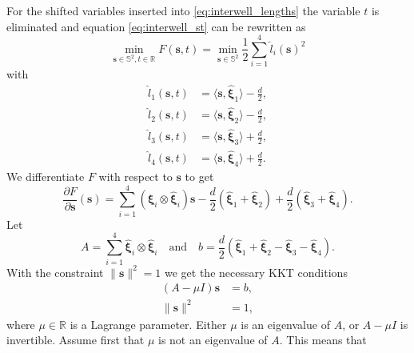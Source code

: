 %
For the shifted variables inserted into \eqref{eq:interwell_lengths} 
the variable $t$ is eliminated and equation \eqref{eq:interwell_st} 
can be rewritten as
%
\begin{equation}
\min_{ \textbf{s} \in \mathbb{S}^2, t \in \mathbb{R}} F(\textbf{s},t)=\min_{ \textbf{s} \in \mathbb{S}^2} \frac{1}{2}  \sum_{i=1}^4 \hat{l}_i(\textbf{s})^2
\end{equation}
%
with
%
\begin{equation}
\begin{aligned}
\hat{l}_1(\textbf{s},t) &=  \langle \textbf{s},\hat{\boldsymbol{\xi}}_1 \rangle - \frac{d}{2}, \\
\hat{l}_2(\textbf{s},t) &=  \langle \textbf{s},\hat{\boldsymbol{\xi}}_2 \rangle - \frac{d}{2}, \\
\hat{l}_3(\textbf{s},t) &=  \langle \textbf{s},\hat{\boldsymbol{\xi}}_3 \rangle + \frac{d}{2}, \\
\hat{l}_4(\textbf{s},t) &=  \langle \textbf{s},\hat{\boldsymbol{\xi}}_4 \rangle + \frac{d}{2}.
\label{eq:interwell_lengths_trans} 
\end{aligned}
\end{equation}
%
We differentiate $F$ with respect to $\textbf{s}$ to get
%
\begin{equation}
\frac{\partial F}{\partial \textbf{s}} (\textbf{s}) =  \sum_{i=1}^4 (\hat{\boldsymbol{\xi}}_i \otimes \hat{\boldsymbol{\xi}}_i)\textbf{s}
- \frac{d}{2}(\hat{\boldsymbol{\xi}}_1 + \hat{\boldsymbol{\xi}}_2) + \frac{d}{2}(\hat{\boldsymbol{\xi}}_3 + \hat{\boldsymbol{\xi}}_4).
\end{equation}
%
Let
%
\begin{equation}
A = \sum_{i=1}^4 \hat{\boldsymbol{\xi}}_i \otimes \hat{\boldsymbol{\xi}}_i \quad \text{and} \quad 
b = \frac{d}{2}(\hat{\boldsymbol{\xi}}_1 + \hat{\boldsymbol{\xi}}_2 - \hat{\boldsymbol{\xi}}_3 - \hat{\boldsymbol{\xi}}_4).
\label{eq:A_b_four_points}
\end{equation}
%
With the constraint $\| \textbf{s}\|^2 = 1$
we get the necessary KKT conditions
%
\begin{equation}
\begin{aligned}
(A-\mu I)\textbf{s} &= b,\\
\|\textbf{s}\|^2 &= 1,
\label{eq:interwell_matrix}
\end{aligned}
\end{equation}
%
where $\mu \in \mathbb{R}$ is a Lagrange parameter.
%
Either $\mu$ is an eigenvalue
of $A$, or $A-\mu I$ is invertible.
%
Assume first that $\mu$ is not an eigenvalue of $A$. This means that
